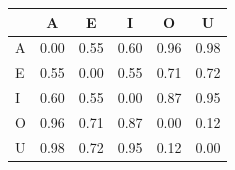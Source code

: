 \begin{tabular}{lccccc}
\toprule
\rowcolor{col01}
 & A & E & I & O & U \\
\midrule
A & 0.00 & 0.55 & 0.60 & 0.96 & 0.98 \\
E & 0.55 & 0.00 & 0.55 & 0.71 & 0.72 \\
I & 0.60 & 0.55 & 0.00 & 0.87 & 0.95 \\
O & 0.96 & 0.71 & 0.87 & 0.00 & 0.12 \\
U & 0.98 & 0.72 & 0.95 & 0.12 & 0.00 \\
\bottomrule
\end{tabular}
